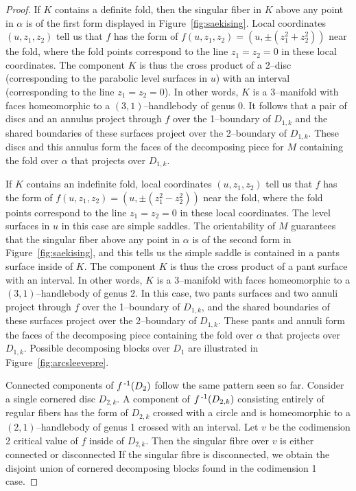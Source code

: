 \begin{proof}
	If $K$ contains a definite fold, then the singular fiber in $K$ above any point in $\alpha$ is of the first form displayed in Figure~\ref{fig:saekising}.
	Local coordinates $(u,z_1,z_2)$ tell us that $f$ has the form of $f(u,z_1,z_2)=(u,\pm(z_1^2+z_2^2))$ near the fold, where the fold points correspond to the line $z_1=z_2=0$ in these local coordinates.
	The component $K$ is thus the cross product of a 2--disc (corresponding to the parabolic level surfaces in $u$) with an interval (corresponding to the line $z_1=z_2=0$).
	In other words, $K$ is a 3--manifold with faces homeomorphic to a $(3,1)$--handlebody of genus 0.
	It follows that a pair of discs and an annulus project through $f$ over the 1--boundary of $D_{1,k}$ and the shared boundaries of these surfaces project over the 2--boundary of $D_{1,k}$.
	These discs and this annulus form the faces of the decomposing piece for $M$ containing the fold over $\alpha$ that projects over $D_{1,k}$.
	
	If $K$ contains an indefinite fold,
	local coordinates $(u,z_1,z_2)$ tell us that $f$ has the form of $f(u,z_1,z_2)=(u,\pm(z_1^2-z_2^2))$ near the fold, where the fold points correspond to the line $z_1=z_2=0$ in these local coordinates.
	The level surfaces in $u$ in this case are simple saddles.
	The orientability of $M$ guarantees that the singular fiber above any point in $\alpha$ is of the second form in Figure~\ref{fig:saekising}, and this tells us the simple saddle is contained in a pants surface inside of $K$.
	The component $K$ is thus the cross product of a pant surface with an interval.
	In other words, $K$ is a 3--manifold with faces homeomorphic to a $(3,1)$--handlebody of genus 2.
	In this case, two pants surfaces and two annuli project through $f$ over the 1--boundary of $D_{1,k}$, and the shared boundaries of these surfaces project over the 2--boundary of $D_{1,k}$.
	These pants and annuli form the faces of the decomposing piece containing the fold over $\alpha$ that projects over $D_{1,k}$.
	Possible decomposing blocks over $D_1$ are illustrated in Figure~\ref{fig:arcsleevepre}.
		
	Connected components of $f^{\,\text{-}1}(D_2)$ follow the same pattern seen so far.
	Consider a single cornered disc $D_{2,k}$.
	A component of $f^{\,\text{-}1}(D_{2,k})$ consisting entirely of regular fibers has the form of $D_{2,k}$ crossed with a circle and is homeomorphic to a $(2,1)$--handlebody of genus 1 crossed with an interval.
	Let $v$ be the codimension 2 critical value of $f$ inside of $D_{2,k}$.
	Then the singular fibre over $v$ is either connected or disconnected
	If the singular fibre is disconnected, we obtain the disjoint union of cornered decomposing blocks found in the codimension 1 case.
	

\end{proof}
